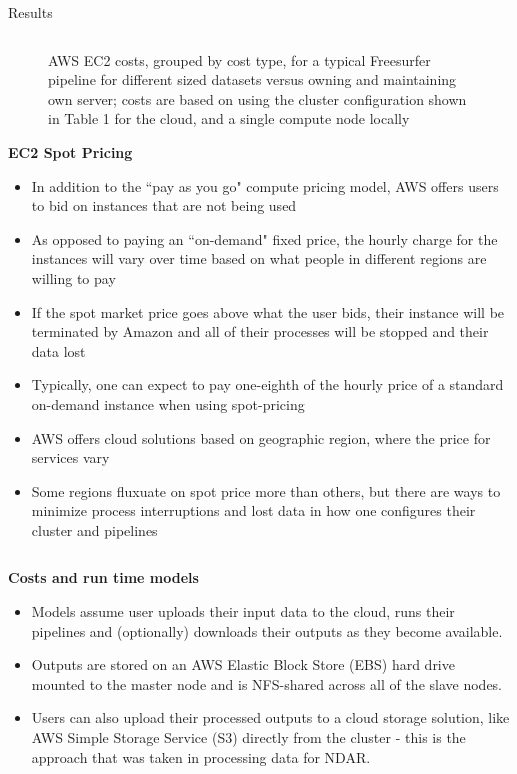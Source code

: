 \documentclass[final,hyperref={pdfpagelabels=false}]{beamer}
\begin{document}
\begin{frame}
\begin{columns}
\begin{column}{.5\textwidth}
{\begin{block}{Results}
\begin{column}{.47\textwidth}
\begin{figure}
                  \caption{\label{fig:fs-costs}AWS EC2 costs, grouped by cost type, for a typical Freesurfer pipeline for different sized datasets versus owning and maintaining own server; costs are based on using the cluster configuration shown in Table 1 for the cloud, and a single compute node locally}
              \end{figure}
              {\bf EC2 Spot Pricing}
              \begin{itemize}
                  \item In addition to the ``pay as you go" compute pricing model, AWS offers users to bid on instances that are not being used
                  \item As opposed to paying an ``on-demand" fixed price, the hourly charge for the instances will vary over time based on what people in different regions are willing to pay
                  \item If the spot market price goes above what the user bids, their instance will be terminated by Amazon and all of their processes will be stopped and their data lost
                  \item Typically, one can expect to pay one-eighth of the hourly price of a standard on-demand instance when using spot-pricing
                  \item AWS offers cloud solutions based on geographic region, where the price for services vary
                  \item Some regions fluxuate on spot price more than others, but there are ways to minimize process interruptions and lost data in how one configures their cluster and pipelines
              \end{itemize}
              \end{column}
          \begin{column}{.47\textwidth}
              {\bf Costs and run time models}
              \begin{itemize}
                  \item Models assume user uploads their input data to the cloud, runs their pipelines and (optionally) downloads their outputs as they become available.
                  \item Outputs are stored on an AWS Elastic Block Store (EBS) hard drive mounted to the master node and is NFS-shared across all of the slave nodes.
                  \item Users can also upload their processed outputs to a cloud storage solution, like AWS Simple Storage Service (S3) directly from the cluster - this is the approach that was taken in processing data for NDAR.

\end{itemize}
\end{column}
\end{block}}
\end{column}
\end{columns}
\end{frame}
\end{document}
